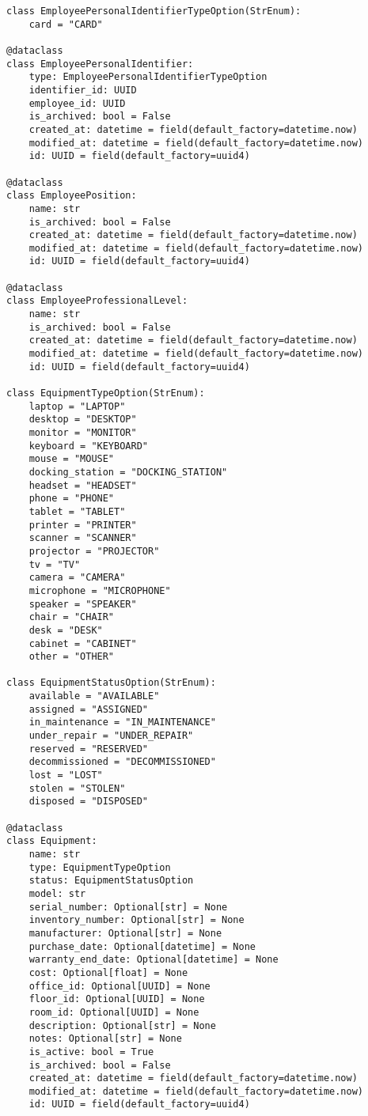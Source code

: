 \begin{lstlisting}[style=pythonstyle]
class EmployeePersonalIdentifierTypeOption(StrEnum):
    card = "CARD"

@dataclass
class EmployeePersonalIdentifier:
    type: EmployeePersonalIdentifierTypeOption
    identifier_id: UUID
    employee_id: UUID
    is_archived: bool = False
    created_at: datetime = field(default_factory=datetime.now)
    modified_at: datetime = field(default_factory=datetime.now)
    id: UUID = field(default_factory=uuid4)

@dataclass
class EmployeePosition:
    name: str
    is_archived: bool = False
    created_at: datetime = field(default_factory=datetime.now)
    modified_at: datetime = field(default_factory=datetime.now)
    id: UUID = field(default_factory=uuid4)

@dataclass
class EmployeeProfessionalLevel:
    name: str
    is_archived: bool = False
    created_at: datetime = field(default_factory=datetime.now)
    modified_at: datetime = field(default_factory=datetime.now)
    id: UUID = field(default_factory=uuid4)

class EquipmentTypeOption(StrEnum):
    laptop = "LAPTOP"
    desktop = "DESKTOP"
    monitor = "MONITOR"
    keyboard = "KEYBOARD"
    mouse = "MOUSE"
    docking_station = "DOCKING_STATION"
    headset = "HEADSET"
    phone = "PHONE"
    tablet = "TABLET"
    printer = "PRINTER"
    scanner = "SCANNER"
    projector = "PROJECTOR"
    tv = "TV"
    camera = "CAMERA"
    microphone = "MICROPHONE"
    speaker = "SPEAKER"
    chair = "CHAIR"
    desk = "DESK"
    cabinet = "CABINET"
    other = "OTHER"

class EquipmentStatusOption(StrEnum):
    available = "AVAILABLE"
    assigned = "ASSIGNED"
    in_maintenance = "IN_MAINTENANCE"
    under_repair = "UNDER_REPAIR"
    reserved = "RESERVED"
    decommissioned = "DECOMMISSIONED"
    lost = "LOST"
    stolen = "STOLEN"
    disposed = "DISPOSED"

@dataclass
class Equipment:
    name: str
    type: EquipmentTypeOption
    status: EquipmentStatusOption
    model: str
    serial_number: Optional[str] = None
    inventory_number: Optional[str] = None
    manufacturer: Optional[str] = None
    purchase_date: Optional[datetime] = None
    warranty_end_date: Optional[datetime] = None
    cost: Optional[float] = None
    office_id: Optional[UUID] = None
    floor_id: Optional[UUID] = None
    room_id: Optional[UUID] = None
    description: Optional[str] = None
    notes: Optional[str] = None
    is_active: bool = True
    is_archived: bool = False
    created_at: datetime = field(default_factory=datetime.now)
    modified_at: datetime = field(default_factory=datetime.now)
    id: UUID = field(default_factory=uuid4)


\end{lstlisting}
